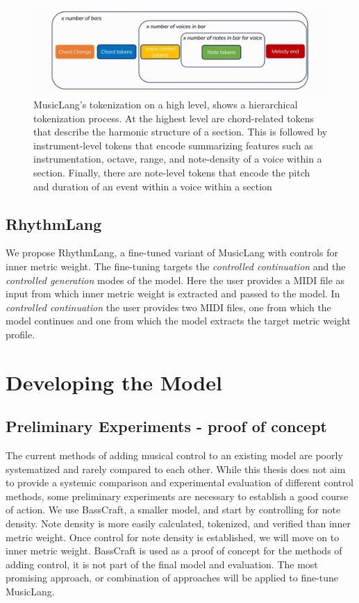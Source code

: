 \begin{figure}[H]
\centering
\includegraphics[width=1\textwidth]{IMAGES/MusicLang.JPG} 
\caption{MusicLang's tokenization on a high level, shows a hierarchical tokenization process. At the highest level are chord-related tokens that describe the harmonic structure of a section. This is followed by instrument-level tokens that encode summarizing features such as instrumentation, octave, range, and note-density of a voice within a section. Finally, there are note-level tokens that encode the pitch and duration of an event within a voice within a section}
\label{fig:musiclangtok}
\end{figure}

\subsection{RhythmLang}
We propose RhythmLang, a fine-tuned variant of MusicLang with controls for inner metric weight. The fine-tuning targets the \textit{controlled continuation} and the \textit{controlled generation} modes of the model. Here the user provides a MIDI file as input from which inner metric weight is extracted and passed to the model. In \textit{controlled continuation} the user provides two MIDI files, one from which the model continues and one from which the model extracts the target metric weight profile. 


\section{Developing the Model}


\subsection{Preliminary Experiments - proof of concept}
The current methods of adding musical control to an existing model are poorly systematized and rarely compared to each other. While this thesis does not aim to provide a systemic comparison and experimental evaluation of different control methods, some preliminary experiments are necessary to establish a good course of action. We use BassCraft, a smaller model, and start by controlling for note density. Note density is more easily calculated, tokenized, and verified than inner metric weight. Once control for note density is established, we will move on to inner metric weight. BassCraft is used as a proof of concept for the methods of adding control, it is not part of the final model and evaluation. The most promising approach, or combination of approaches will be applied to fine-tune MusicLang. 

